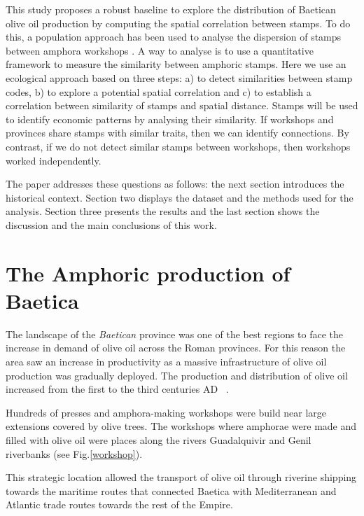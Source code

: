 \documentclass[review]{elsarticle}
\begin{document}
This study proposes a robust baseline to explore the distribution of Baetican olive oil production by computing the spatial correlation between stamps. To do this, a population approach has been used to analyse the dispersion of stamps between amphora workshops \citep{rubio-campillo_ecology_2018}.  A way to analyse is to use a quantitative framework to measure the similarity between amphoric stamps. Here we use an ecological approach based on three steps: a) to detect similarities between stamp codes, b) to explore a potential spatial correlation and c) to establish a correlation between similarity of stamps and spatial distance. Stamps will be used to identify economic patterns by analysing their similarity. If workshops and provinces share stamps with similar traits, then we can identify connections. By contrast, if we do not detect similar stamps between workshops, then workshops worked independently. 

The paper addresses these questions as follows: the next section introduces the historical context. Section two displays the dataset and the methods used for the analysis. Section three presents the results and the last section shows the discussion and the main conclusions of this work. 


\section{The Amphoric production of Baetica}

The landscape of the \textit{Baetican} province was one of the best regions to face the increase in demand of olive oil across the Roman provinces. For this reason the area saw an increase in productivity as a massive infrastructure of olive oil production was gradually deployed. The production and distribution of olive oil increased from the first to the third centuries AD ~\citep{remesal_concierto}. 


Hundreds of presses and amphora-making workshops were build near large extensions covered by olive trees. The workshops where amphorae were made and filled with olive oil were places along the rivers Guadalquivir and Genil riverbanks (see Fig.\ref{workshop}).

This strategic location allowed the transport of olive oil through riverine shipping towards the maritime routes that connected Baetica with Mediterranean and Atlantic trade routes towards the rest of the Empire\citep{garcia_vargas_enrique_formal_2010}.
\end{document}
